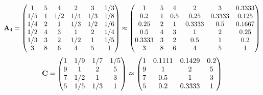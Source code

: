 \documentclass[10pt,a4paper]{article}
\begin{document}
	\[
		\bold{A}_{4} = 
		\begin{pmatrix}
			{1}{} & {{5}}{} & {{4}}{} & {{2}}{} & {{3}}{} & {1} / {{3}} \\
			{1} / {{5}} & {1}{} & {1} / {{2}} & {1} / {{4}} & {1} / {{3}} & {1} / {{8}} \\
			{1} / {{4}} & {{2}}{} & {1}{} & {1} / {{3}} & {1} / {{2}} & {1} / {{6}} \\
			{1} / {{2}} & {{4}}{} & {{3}}{} & {1}{} & {{2}}{} & {1} / {{4}} \\
			{1} / {{3}} & {{3}}{} & {{2}}{} & {1} / {{2}} & {1}{} & {1} / {{5}} \\
			{{3}}{} & {{8}}{} & {{6}}{} & {{4}}{} & {{5}}{} & {1}{} \\
		\end{pmatrix}
		\approx
		\begin{pmatrix}
			1        & 5        & 4        & 2        & 3        & 0.3333   \\
			0.2      & 1        & 0.5      & 0.25     & 0.3333   & 0.125    \\
			0.25     & 2        & 1        & 0.3333   & 0.5      & 0.1667   \\
			0.5      & 4        & 3        & 1        & 2        & 0.25     \\
			0.3333   & 3        & 2        & 0.5      & 1        & 0.2      \\
			3        & 8        & 6        & 4        & 5        & 1        \\
		\end{pmatrix}
	\]
	\[
		\bold{C} = 
		\begin{pmatrix}
			{1}{} & {1} / {{9}} & {1} / {{7}} & {1} / {{5}} \\
			{{9}}{} & {1}{} & {{2}}{} & {{5}}{} \\
			{{7}}{} & {1} / {{2}} & {1}{} & {{3}}{} \\
			{{5}}{} & {1} / {{5}} & {1} / {{3}} & {1}{} \\
		\end{pmatrix}
		\approx
		\begin{pmatrix}
			1        & 0.1111   & 0.1429   & 0.2      \\
			9        & 1        & 2        & 5        \\
			7        & 0.5      & 1        & 3        \\
			5        & 0.2      & 0.3333   & 1        \\
		\end{pmatrix}
	\]
\end{document}
